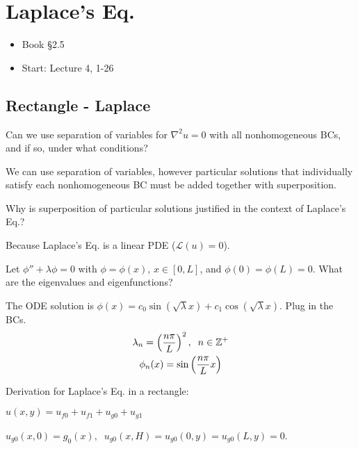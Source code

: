 \chapter{Laplace's Eq.}

\begin{itemize}
	\item Book \S 2.5
	\item Start: Lecture 4, 1-26 
\end{itemize}

\section{Rectangle - Laplace}

\begin{quest}
	\item Can we use separation of variables for $\nabla^2 u = 0$ with all nonhomogeneous BCs, and if so, under what conditions?
	\begin{ans}
		We can use separation of variables, however particular solutions that individually satisfy each nonhomogeneous BC must be added together with superposition. 
	\end{ans}

	\item Why is superposition of particular solutions justified in the context of Laplace's Eq.? 
	\begin{ans}
		Because Laplace's Eq. is a linear PDE ($\mathcal{L}(u) = 0 $).
	\end{ans}

	\item Let $\phi'' + \lambda \phi = 0$ with $\phi = \phi(x)$, $x\in [0, L]$, and $\phi(0) = \phi(L) = 0$. What are the eigenvalues and eigenfunctions?
	\begin{ans}
		The ODE solution is $\phi(x) = c_0 \sin (\sqrt{\lambda} x) + c_1 \cos (\sqrt{\lambda} x)$. Plug in the BCs. 
		\begin{gather*}
			\lambda_n = \left( \frac{n\pi}{L} \right)^2, \;\; n\in \mathbb{Z}^+ \\
			\phi_n(x) = \sin \left( \frac{n\pi}{L} x \right) 
		\end{gather*}
	\end{ans}
\end{quest}


Derivation for Laplace's Eq. in a rectangle:

$u(x, y) = u_{f0} + u_{f1} + u_{g0} + u_{g1}$

$u_{g0}(x, 0) = g_0(x), \;\;u_{g0}(x, H) = u_{g0}(0, y) = u_{g0}(L, y) = 0$.

